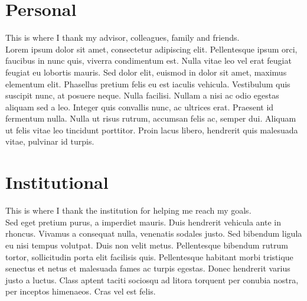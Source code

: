 \section*{Personal}
This is where I thank my advisor, colleagues, family and friends.\\
Lorem ipsum dolor sit amet, consectetur adipiscing elit. Pellentesque ipsum orci, faucibus in nunc quis, viverra condimentum est. Nulla vitae leo vel erat feugiat feugiat eu lobortis mauris. Sed dolor elit, euismod in dolor sit amet, maximus elementum elit. Phasellus pretium felis eu est iaculis vehicula. Vestibulum quis suscipit nunc, at posuere neque. Nulla facilisi. Nullam a nisi ac odio egestas aliquam sed a leo. Integer quis convallis nunc, ac ultrices erat. Praesent id fermentum nulla. Nulla ut risus rutrum, accumsan felis ac, semper dui. Aliquam ut felis vitae leo tincidunt porttitor. Proin lacus libero, hendrerit quis malesuada vitae, pulvinar id turpis.\\

\section*{Institutional}
This is where I thank the institution for helping me reach my goals.\\
Sed eget pretium purus, a imperdiet mauris. Duis hendrerit vehicula ante in rhoncus. Vivamus a consequat nulla, venenatis sodales justo. Sed bibendum ligula eu nisi tempus volutpat. Duis non velit metus. Pellentesque bibendum rutrum tortor, sollicitudin porta elit facilisis quis. Pellentesque habitant morbi tristique senectus et netus et malesuada fames ac turpis egestas. Donec hendrerit varius justo a luctus. Class aptent taciti sociosqu ad litora torquent per conubia nostra, per inceptos himenaeos. Cras vel est felis.